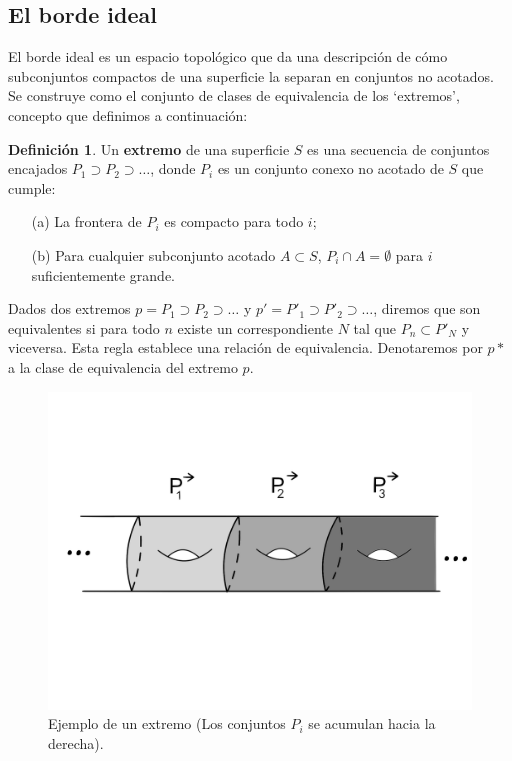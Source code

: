 \documentclass[a4paper,11pt,spanish, twoside, leqno]{tfg-uam}
\theoremstyle{definition}
\newtheorem{defin}[teor]{Definici\'on}
\begin{document}
\subsection{El borde ideal}
El borde ideal es un espacio topológico que da una descripción de cómo subconjuntos compactos de una superficie la separan en conjuntos no acotados. Se construye como el conjunto de clases de equivalencia de los `extremos', concepto que definimos a continuación:

\begin{defin}
\label{defin:extremo}
Un \textbf{extremo} de una superficie $S$ es una secuencia de conjuntos encajados $P_1 \supset P_2 \supset \ldots$, donde $P_i$ es un conjunto conexo no acotado de $S$ que cumple:
\begin{enumerate}
\item[(a)] La frontera de $P_i$ es compacto para todo $i$;
\item[(b)] Para cualquier subconjunto acotado $A \subset S$, $P_i \cap A = \emptyset$ para $i$ suficientemente grande.
\end{enumerate}
\end{defin}
Dados dos extremos $p = P_1 \supset P_2 \supset \ldots$  y  $p' = P'_1 \supset P'_2 \supset \ldots$, diremos que son equivalentes si para todo $n$ existe un correspondiente $N$ tal que $P_n \subset P'_N$ y viceversa.  Esta regla establece una relación de equivalencia. Denotaremos por $p*$ a la clase de equivalencia del extremo $p$.


\begin{figure}[h!]
	\centering
	\includegraphics[width=0.5\linewidth]{imagenes/final.png}
	\caption{Ejemplo de un extremo (Los conjuntos $P_i$ se acumulan hacia la derecha).}
	\label{fig:extremo}
\end{figure}
\end{document}
